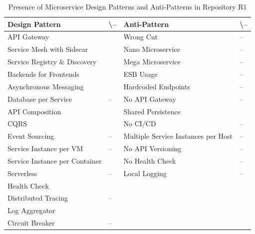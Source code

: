 \documentclass{Configuration_Files/PoliMi3i_thesis}
\newcommand{\cmark}{\ding{51}}%
\begin{document}
\begin{table}[H]
\centering 
    \begin{tabular}{ 
  | >{\centering\arraybackslash} m{16em} 
  | >{\centering\arraybackslash} m{2.2em} 
  | >{\centering\arraybackslash} m{16em} 
  | >{\centering\arraybackslash} m{2.2em} | }
    \hline
    \rowcolor{bluepoli!40}
    \textbf{Design Pattern} & \cmark \textbackslash – & \textbf{Anti-Pattern} & \cmark \textbackslash – \T\B \\
    \hline \hline
    API Gateway & \cmark & Wrong Cut & – \T\B\\
    \hline
    \rowcolor{bluepoli!10}
    Service Mesh with Sidecar & \cmark & Nano Microservice & – \T\B \\
    \hline
    Service Registry \& Discovery & \cmark & Mega Microservice & – \T\B \\
    \hline
    \rowcolor{bluepoli!10}
    Backends for Frontends & \cmark & ESB Usage & – \T\B \\
    \hline
    Asynchronous Messaging & \cmark & Hardcoded Endpoints & – \T\B \\
    \hline
    \rowcolor{bluepoli!10}
    Database per Service & – & No API Gateway & – \T\B \\
    \hline
    API Composition & \cmark & Shared Persistence & \cmark \T\B \\
    \hline
    \rowcolor{bluepoli!10}
    CQRS & \cmark & No CI/CD & – \T\B \\
    \hline
    Event Sourcing & – & Multiple Service Instances per Host & – \T\B \\
    \hline
    \rowcolor{bluepoli!10}
    Service Instance per VM & – & No API Versioning & – \T\B \\
    \hline
    Service Instance per Container & \cmark & No Health Check & – \T\B \\
    \hline
    \rowcolor{bluepoli!10}
    Serverless & – & Local Logging & – \T\B \\
    \hline
    Health Check & \cmark &  & \T\B \\
    \hline
    \rowcolor{bluepoli!10}
    Distributed Tracing & – & & \T\B \\
    \hline
    Log Aggregator & \cmark &  & \T\B \\
    \hline
    \rowcolor{bluepoli!10}
    Circuit Breaker & – &  & \T\B \\
    \hline
    \end{tabular}
    \\[10pt]
    \caption{Presence of Microservice Design Patterns and Anti-Patterns in Repository R1}
    \label{table:R1_result}
\end{table}
\end{document}

